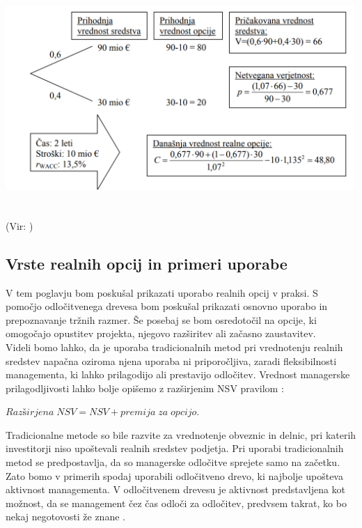 \includegraphics[width=15cm, height=9cm]{binomski_model}
(Vir: \cite[str. 24]{Mohar})

\subsection{Vrste realnih opcij in primeri uporabe}
V tem poglavju bom poskušal prikazati uporabo realnih opcij v praksi. S pomočjo odločitvenega drevesa bom poskušal prikazati osnovno uporabo in prepoznavanje tržnih razmer. Še posebaj se bom osredotočil na opcije, ki omogočajo opustitev projekta, njegovo razširitev ali začasno zaustavitev. \\

Videli bomo lahko, da je uporaba tradicionalnih metod pri vrednotenju realnih sredstev napačna oziroma njena uporaba ni priporočljiva, zaradi fleksibilnosti managementa, ki lahko prilagodijo ali prestavijo odločitev. Vrednost managerske prilagodljivosti lahko bolje opišemo z razširjenim NSV pravilom \cite[str. 151, 152]{Trigeorgis}:
\begin{center}
$Razširjena\;NSV = NSV + premija\;za\;opcijo$.
\end{center}
Tradicionalne metode so bile razvite za vrednotenje obveznic in delnic, pri katerih investitorji niso upoštevali realnih sredstev podjetja. Pri uporabi tradicionalnih metod se predpostavlja, da so managerske odločitve sprejete samo na začetku. Zato bomo v primerih spodaj uporabili odločitveno drevo, ki najbolje upošteva aktivnost managementa. V odločitvenem drevesu je aktivnost predstavljena kot možnost, da se management čez čas odloči za odločitev, predvsem takrat, ko bo nekaj negotovosti že znane \cite[str. 152]{Trigeorgis}. \\

